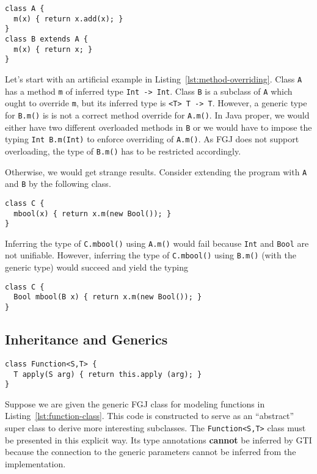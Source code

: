 \begin{lstlisting}[float,caption={Method overriding},label={lst:method-overriding}]
class A {
  m(x) { return x.add(x); }
}
class B extends A {
  m(x) { return x; }
}
\end{lstlisting}
Let's start with an artificial example in Listing~\ref{lst:method-overriding}. Class \texttt{A} has
a method \texttt{m} of inferred type \texttt{Int -> Int}. Class \texttt{B} is a
subclass of \texttt{A} which ought to override \texttt{m}, but its inferred
type is \texttt{<T> T -> T}.
However, a generic type for \texttt{B.m()} is is not a correct
method override for \texttt{A.m()}. In Java proper, we would either
have two different overloaded methods in \texttt{B} or we would have
to impose
the typing \texttt{Int B.m(Int)} to enforce overriding of
\texttt{A.m()}. As FGJ does not support overloading, the type of
\texttt{B.m()} has to be restricted accordingly.

Otherwise, we would get strange results. Consider extending the
program with \texttt{A} and \texttt{B} by the following class.
\begin{lstlisting}
class C {
  mbool(x) { return x.m(new Bool()); }
}
\end{lstlisting}
Inferring the type of \texttt{C.mbool()} using \texttt{A.m()} would
fail because \texttt{Int} and \texttt{Bool} are not
unifiable. However, inferring the type of \texttt{C.mbool()} using
\texttt{B.m()} (with the generic type) would succeed and yield the
typing
\begin{lstlisting}
class C {
  Bool mbool(B x) { return x.m(new Bool()); }
}
\end{lstlisting}

\subsection{Inheritance and Generics}
\label{sec:inheritance-generics}


\begin{lstlisting}[float,caption={Function class}, label={lst:function-class}]
class Function<S,T> {
  T apply(S arg) { return this.apply (arg); }
}
\end{lstlisting}
Suppose we are given the generic FGJ class for modeling functions in Listing~\ref{lst:function-class}.
This code is constructed to serve as an ``abstract'' super class to derive more
interesting subclasses.
The \texttt{Function<S,T>} class must be presented in this explicit
way. Its type annotations \textbf{cannot} be inferred by GTI because
the connection to the generic parameters cannot be inferred from the
implementation.

